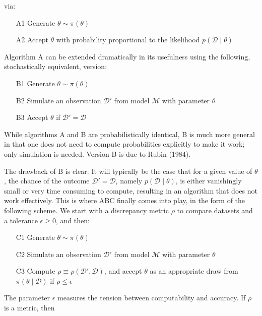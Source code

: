 via:

\begin{itemize}
    \item[A1] Generate $\theta \sim \pi(\theta)$
    \item[A2] Accept $\theta$ with probability proportional to the likelihood $p(\mathcal{D}\mid \theta)$
\end{itemize}
    
Algorithm A can be extended dramatically in its usefulness using the following, stochastically equivalent, version:

\begin{itemize}
    \item[B1] Generate $\theta \sim \pi(\theta)$
    \item[B2] Simulate an observation $\mathcal{D}'$ from model $\mathcal{M}$ with parameter $\theta$
    \item[B3] Accept $\theta$ if $\mathcal{D}' = \mathcal{D}$
\end{itemize}
    

While algorithms A and B are probabilistically identical, B is much more general in that one does not need to compute probabilities explicitly to make it work; only simulation is needed. Version B is due to Rubin (1984). 

The drawback of B is clear. It will typically be the case that for a given value of $\theta$, the chance of the outcome $\mathcal{D}'=\mathcal{D}$, namely $p(\mathcal{D} \mid \theta)$, is either vanishingly small or very time consuming to compute, resulting in an algorithm that does not work effectively. This is where ABC finally comes into play, in the form of the following scheme. We start with a discrepancy metric $\rho$ to compare datasets and a tolerance $\epsilon \geq 0$, and then: 

\begin{itemize}
    \item[C1] Generate $\theta \sim \pi(\theta)$
    \item[C2] Simulate an observation $\mathcal{D}'$ from model $\mathcal{M}$ with parameter $\theta$
    \item[C3] Compute $\rho \equiv \rho (\mathcal{D}', \mathcal{D})$, and accept $\theta$ as an appropriate draw from $\pi (\theta \mid \mathcal{D})$ if $\rho \leq \epsilon$
\end{itemize}
    
The parameter $\epsilon$ measures the tension between computability and accuracy. If $\rho$ is a metric, then 

